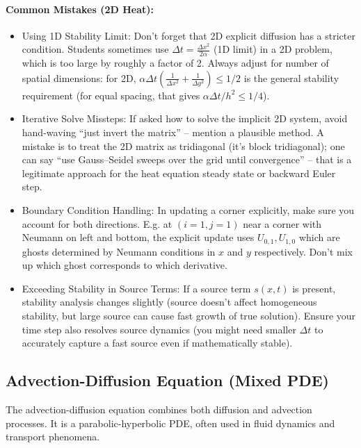 \documentclass[a4paper,11pt]{report}
\begin{document}
\paragraph{Common Mistakes (2D Heat):}
\begin{itemize}
    \item Using 1D Stability Limit: Don’t forget that 2D explicit diffusion has a stricter condition. Students sometimes use $\Delta t = \frac{\Delta x^2}{2\alpha}$ (1D limit) in a 2D problem, which is too large by roughly a factor of 2. Always adjust for number of spatial dimensions: for 2D, $\alpha\Delta t(\frac{1}{\Delta x^2}+\frac{1}{\Delta y^2}) \le 1/2$ is the general stability requirement (for equal spacing, that gives $\alpha \Delta t/h^2 \le 1/4$).
    \item Iterative Solve Missteps: If asked how to solve the implicit 2D system, avoid hand-waving “just invert the matrix” -- mention a plausible method. A mistake is to treat the 2D matrix as tridiagonal (it’s block tridiagonal); one can say “use Gauss--Seidel sweeps over the grid until convergence” -- that is a legitimate approach for the heat equation steady state or backward Euler step.
    \item Boundary Condition Handling: In updating a corner explicitly, make sure you account for both directions. E.g. at $(i=1,j=1)$ near a corner with Neumann on left and bottom, the explicit update uses $U_{0,1}, U_{1,0}$ which are ghosts determined by Neumann conditions in $x$ and $y$ respectively. Don’t mix up which ghost corresponds to which derivative.
    \item Exceeding Stability in Source Terms: If a source term $s(x,t)$ is present, stability analysis changes slightly (source doesn’t affect homogeneous stability, but large source can cause fast growth of true solution). Ensure your time step also resolves source dynamics (you might need smaller $\Delta t$ to accurately capture a fast source even if mathematically stable).
\end{itemize}

\subsection{Advection-Diffusion Equation (Mixed PDE)}
The advection-diffusion equation combines both diffusion and advection processes. It is a parabolic-hyperbolic PDE, often used in fluid dynamics and transport phenomena.
\end{document}
